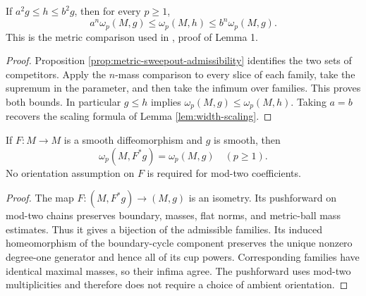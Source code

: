 \begin{proposition}\label{prop:width-metric-comparison}
If $a^2g\leq h\leq b^2g$, then for every $p\geq1$,
\[
 a^n\omega_p(M,g)\leq\omega_p(M,h)\leq b^n\omega_p(M,g).
\]
This is the metric comparison used in \cite{MNS19}, proof of Lemma 1.
\end{proposition}
\begin{proof}
Proposition \ref{prop:metric-sweepout-admissibility} identifies the two sets of competitors. Apply the $n$-mass comparison to every slice of each family, take the supremum in the parameter, and then take the infimum over families. This proves both bounds. In particular $g\leq h$ implies $\omega_p(M,g)\leq\omega_p(M,h)$. Taking $a=b$ recovers the scaling formula of Lemma \ref{lem:width-scaling}.
\end{proof}

\begin{proposition}\label{prop:width-diffeomorphism-invariance}
If $F:M\to M$ is a smooth diffeomorphism and $g$ is smooth, then
\[
 \omega_p(M,F^*g)=\omega_p(M,g)\quad(p\geq1).
\]
No orientation assumption on $F$ is required for mod-two coefficients.
\end{proposition}
\begin{proof}
The map $F:(M,F^*g)\to(M,g)$ is an isometry. Its pushforward on mod-two chains preserves boundary, masses, flat norms, and metric-ball mass estimates. Thus it gives a bijection of the admissible families. Its induced homeomorphism of the boundary-cycle component preserves the unique nonzero degree-one generator and hence all of its cup powers. Corresponding families have identical maximal masses, so their infima agree. The pushforward uses mod-two multiplicities and therefore does not require a choice of ambient orientation.
\end{proof}

